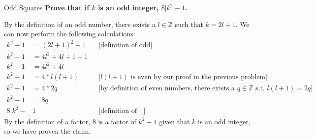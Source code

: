 \documentclass[11pt, nopagenumbers]{adamblan-hw}
\begin{document}
    \begin{question}{\color{red} Odd Squares}
        \textbf{Prove that if $k$ is an odd integer, $8 | k^2 - 1$.}
        
        By the definition of an odd number, there exists a $l \in \mathbb{Z}$ such that
        $k = 2l + 1$. We can now perform the following calculations:
        \begin{align*}
        k^2 - 1 &= (2l + 1)^2 - 1&& \text{[definition of odd]} \\
        k^2 - 1 &= 4l^2 + 4l + 1 - 1\\
        k^2 - 1 &= 4l^2 + 4l \\
        k^2 - 1 &= 4 * l(l + 1) && \text{[$l(l + 1)$ is even by our proof in the previous problem]}\\
        k^2 - 1 &= 4 * 2q && \text{[by definition of even numbers, there exists a $q \in \mathbb{Z}$ s.t. $l(l + 1) = 2q$]} \\
        k^2 - 1 &= 8q \\
        8 | k^2 - &1 && \text{[definition of | ]}
        \end{align*}
        By the definition of a factor, $8$ is a factor of $k^2 - 1$ given that $k$ is an odd integer, so we
        have proven the claim.
    \end{question}
\end{document}

